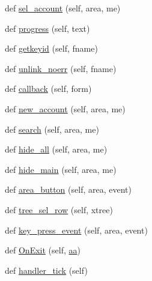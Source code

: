 \begin{DoxyCompactItemize}
\item 
def \hyperlink{classdibagui_1_1_main_win_a6560530dba3370587c143736243793dc}{sel\+\_\+account} (self, area, me)
\item 
def \hyperlink{classdibagui_1_1_main_win_a56d6515e433aa4438622a3b3018913f5}{progress} (self, text)
\item 
def \hyperlink{classdibagui_1_1_main_win_a86a755556573728d23d3e706fb9341d9}{getkeyid} (self, fname)
\item 
def \hyperlink{classdibagui_1_1_main_win_ac2cede4bac22a589ebaae85651b77044}{unlink\+\_\+noerr} (self, fname)
\item 
def \hyperlink{classdibagui_1_1_main_win_a3006900cda7e6488b47296f3d0e420d3}{callback} (self, form)
\item 
def \hyperlink{classdibagui_1_1_main_win_ae455d2242af7dfc4e37c5db6f35e95fe}{new\+\_\+account} (self, area, me)
\item 
def \hyperlink{classdibagui_1_1_main_win_a5bbd1b5cae9e1e19a7ec7b2c1d48a834}{search} (self, area, me)
\item 
def \hyperlink{classdibagui_1_1_main_win_a0a399ceb2dc96ea47058aac94ae57047}{hide\+\_\+all} (self, area, me)
\item 
def \hyperlink{classdibagui_1_1_main_win_af4abcf75503c410e06d84af1a37909ea}{hide\+\_\+main} (self, area, me)
\item 
def \hyperlink{classdibagui_1_1_main_win_a260d37924dae7e20867bbd197b9044ee}{area\+\_\+button} (self, area, event)
\item 
def \hyperlink{classdibagui_1_1_main_win_a749f5e0497d5754e5c7800c8dc9d417c}{tree\+\_\+sel\+\_\+row} (self, xtree)
\item 
def \hyperlink{classdibagui_1_1_main_win_a7bb32848df24886f6972b780116052d2}{key\+\_\+press\+\_\+event} (self, area, event)
\item 
def \hyperlink{classdibagui_1_1_main_win_a41e1747cd5317f94dc683e74608bf7c6}{On\+Exit} (self, \hyperlink{namespacedibagui_a74b87337454200d4d33f80c4663dc5e5}{aa})
\item 
def \hyperlink{classdibagui_1_1_main_win_a22fab0ca18f0c6d3a657200fc3af5a52}{handler\+\_\+tick} (self)
\end{DoxyCompactItemize}
